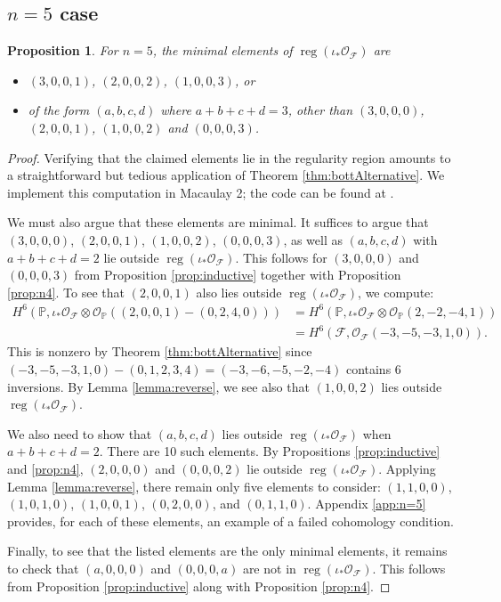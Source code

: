\documentclass[12pt,reqno]{amsart}
\newtheorem{proposition}[theorem]{Proposition}
\theoremstyle{definition}
\theoremstyle{remark}
\newcommand{\reg}{\operatorname{reg}}
\newcommand{\calF}{{\mathcal{F}}}
\newcommand{\calO}{{\mathcal{O}}}
\begin{document}

\subsection{$n=5$ case}

 \begin{proposition} \label{prop:n=5}
    For $n=5$, the minimal elements of $\reg(\iota_*\calO_{\calF})$ are
\begin{itemize}
    \item $(3,0,0,1)$, $(2,0,0,2)$, $(1,0,0,3)$, or
    \item of the form $(a,b,c,d)$ where $a+b+c+d = 3$, other than $(3,0,0,0)$, $(2,0,0,1)$, $(1,0,0,2)$ and $(0,0,0,3)$.
\end{itemize}
\end{proposition}

\begin{proof}

Verifying that the claimed elements lie in the regularity region amounts to a straightforward but tedious application of Theorem \ref{thm:bottAlternative}.  We implement this computation in Macaulay 2; the code can be found at \cite{githubRepo}.

We must also argue that these elements are minimal.  It suffices to argue that $(3,0,0,0)$, $(2,0,0,1)$, $(1,0,0,2)$, $(0,0,0,3)$, as well as $(a,b,c,d)$ with $a+b+c+d = 2$ lie outside $\reg(\iota_*\calO_{\calF})$.  This follows for $(3,0,0,0)$ and $(0,0,0,3)$ from Proposition \ref{prop:inductive} together with Proposition \ref{prop:n4}. To see that $(2,0,0,1)$ also lies outside $\reg(\iota_*\calO_{\calF})$, we compute:
\begin{align*}
        H^6(\mathbb P, \iota_*\calO_{\calF}\otimes \calO_{\mathbb P}((2,0,0,1)-(0,2,4,0))) &= H^6(\mathbb P, \iota_*\calO_{\calF}\otimes \calO_{\mathbb P}(2,-2,-4,1))\\
        &= H^6(\calF, \calO_{\calF}(-3,-5,-3,1,0)).
    \end{align*}
This is nonzero by Theorem \ref{thm:bottAlternative} since $(-3,-5,-3,1,0) - (0,1,2,3,4) = (-3,-6,-5,-2,-4)$ contains 6 inversions.  By Lemma \ref{lemma:reverse}, we see also that $(1,0,0,2)$ lies outside $\reg(\iota_*\calO_{\calF})$.

We also need to show that $(a,b,c,d)$ lies outside $\reg(\iota_*\calO_{\calF})$ when $a+b+c+d = 2$. There are 10 such elements.  By Propositions \ref{prop:inductive} and \ref{prop:n4}, $(2,0,0,0)$ and $(0,0,0,2)$ lie outside $\reg(\iota_*\calO_{\calF})$.  Applying Lemma \ref{lemma:reverse}, there remain only five elements to consider: $(1,1,0,0)$, $(1,0,1,0)$, $(1,0,0,1)$, $(0,2,0,0)$, and $(0,1,1,0)$.  
Appendix \ref{app:n=5} provides, for each of these elements, an example of a failed cohomology condition.

Finally, to see that the listed elements are the only minimal elements, it remains to check that $(a,0,0,0)$ and $(0,0,0,a)$ are not in $\reg(\iota_*\calO_{\calF})$.  This follows from Proposition \ref{prop:inductive} along with Proposition \ref{prop:n4}.
\end{proof}
\end{document}
